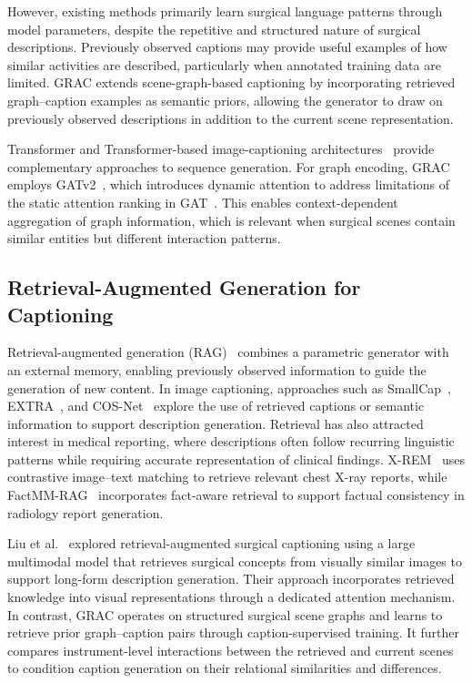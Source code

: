 \documentclass[11pt]{article}
\begin{document}
However, existing methods primarily learn surgical language patterns through model parameters, despite the repetitive and structured nature of surgical descriptions. Previously observed captions may provide useful examples of how similar activities are described, particularly when annotated training data are limited. GRAC extends scene-graph-based captioning by incorporating retrieved graph--caption examples as semantic priors, allowing the generator to draw on previously observed descriptions in addition to the current scene representation.

Transformer and Transformer-based image-captioning architectures~\cite{b12,b13,b14,b15} provide complementary approaches to sequence generation. For graph encoding, GRAC employs GATv2~\cite{b16}, which introduces dynamic attention to address limitations of the static attention ranking in GAT~\cite{b17}. This enables context-dependent aggregation of graph information, which is relevant when surgical scenes contain similar entities but different interaction patterns.

\subsection{Retrieval-Augmented Generation for Captioning}\label{subsec2.2}

Retrieval-augmented generation (RAG)~\cite{b18} combines a parametric generator with an external memory, enabling previously observed information to guide the generation of new content. In image captioning, approaches such as SmallCap~\cite{b6}, EXTRA~\cite{b7}, and COS-Net~\cite{b19} explore the use of retrieved captions or semantic information to support description generation. Retrieval has also attracted interest in medical reporting, where descriptions often follow recurring linguistic patterns while requiring accurate representation of clinical findings. X-REM~\cite{b20} uses contrastive image--text matching to retrieve relevant chest X-ray reports, while FactMM-RAG~\cite{b21} incorporates fact-aware retrieval to support factual consistency in radiology report generation.

Liu et al.~\cite{b22} explored retrieval-augmented surgical captioning using a large multimodal model that retrieves surgical concepts from visually similar images to support long-form description generation. Their approach incorporates retrieved knowledge into visual representations through a dedicated attention mechanism. In contrast, GRAC operates on structured surgical scene graphs and learns to retrieve prior graph--caption pairs through caption-supervised training. It further compares instrument-level interactions between the retrieved and current scenes to condition caption generation on their relational similarities and differences.
\end{document}
